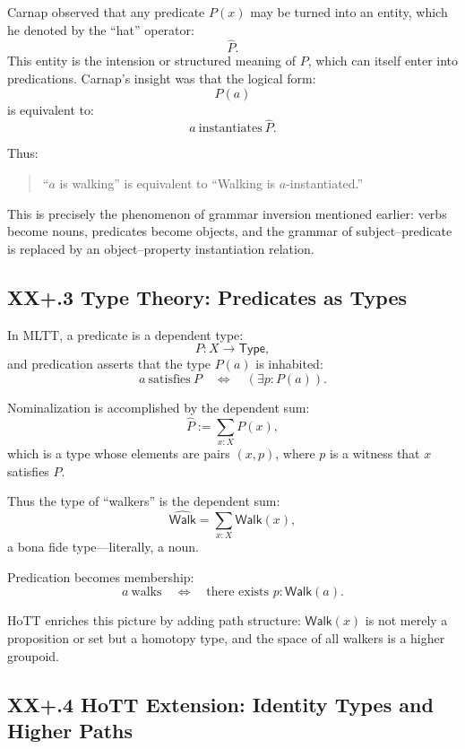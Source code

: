 \documentclass[12pt,letterpaper]{article}
\begin{document}
Carnap observed that any predicate $P(x)$ may be turned into an entity, which he
denoted by the ``hat'' operator:
\[
\widehat{P}.
\]
This entity is the intension or structured meaning of $P$, which can itself
enter into predications.  Carnap’s insight was that the logical form:
\[
P(a)
\]
is equivalent to:
\[
a\ \text{instantiates}\ \widehat{P}.
\]

Thus:
\begin{quote}
``$a$ is walking''  
is equivalent to  
``Walking is $a$-instantiated.''
\end{quote}

This is precisely the phenomenon of grammar inversion mentioned earlier: verbs
become nouns, predicates become objects, and the grammar of subject--predicate
is replaced by an object--property instantiation relation.

\subsection{XX+.3 Type Theory: Predicates as Types}

In MLTT, a predicate is a dependent type:
\[
P : X \to \mathsf{Type},
\]
and predication asserts that the type $P(a)$ is inhabited:
\[
a\ \text{satisfies}\ P 
\quad\Longleftrightarrow\quad 
(\exists p : P(a)).
\]

Nominalization is accomplished by the dependent sum:
\[
\widehat{P} := \sum_{x:X} P(x),
\]
which is a type whose elements are pairs $(x,p)$, where $p$ is a witness that $x$
satisfies $P$.

Thus the type of ``walkers'' is the dependent sum:
\[
\widehat{\mathsf{Walk}} = \sum_{x:X} \mathsf{Walk}(x),
\]
a bona fide type---literally, a noun.

Predication becomes membership:
\[
a\ \text{walks} \quad\Longleftrightarrow\quad \text{there exists } p : \mathsf{Walk}(a).
\]

HoTT enriches this picture by adding path structure: $\mathsf{Walk}(x)$ is not
merely a proposition or set but a homotopy type, and the space of all walkers is
a higher groupoid.

\subsection{XX+.4 HoTT Extension: Identity Types and Higher Paths}
\end{document}
